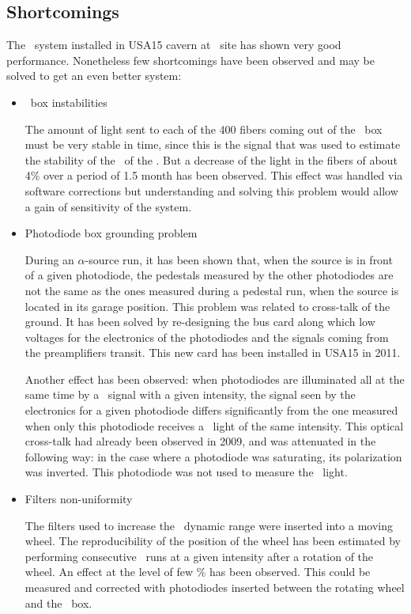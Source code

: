 \subsection{Shortcomings}
The \las~system installed in USA15 cavern at \atlas~site has shown very good performance. Nonetheless few shortcomings have been observed and may be solved to get an even better system:
\begin{itemize}
\item{\coimbra~box instabilities} 
	
The amount of light sent to each of the 400 fibers coming out of the \coimbra~box must be very stable in time, since this is the signal that was used to estimate the stability of the \pmts~of the \tilecal. But a decrease of the light in the fibers of about 4\% over a period of 1.5 month has been observed. This effect was handled via software corrections but understanding and solving this problem would allow a gain of sensitivity of the system.
	
\item{Photodiode box grounding problem} 
	
During an $\alpha$-source run, it has been shown that, when the source is in front of a given photodiode, the pedestals measured by the other photodiodes are not the same as the ones measured during a pedestal run, when the source is located in its garage position. This problem was related to cross-talk of the ground. It has been solved by re-designing the bus card along which low voltages for the electronics of the photodiodes and the signals coming from the preamplifiers transit. This new card has been installed in USA15 in 2011. \par
Another effect has been observed: when photodiodes are illuminated all at the same time by a \las~signal with a given intensity, the signal seen by the electronics for a given photodiode differs significantly from the one measured when only this photodiode receives a \las~light of the same intensity. This optical cross-talk had already been observed in 2009, and was attenuated in the following way: in the case where a photodiode was saturating, its polarization was inverted. This photodiode was not used to measure the  \las~light. 
		
\item{Filters non-uniformity}
	
The filters used to increase the \las~dynamic range were inserted into a moving wheel. The reproducibility of the position of the wheel has been estimated by performing consecutive \las~runs at a given intensity after a rotation of the wheel. An effect at the level of few \% has been observed. This could be measured and corrected with photodiodes inserted between the rotating wheel and the \coimbra~box.
	

\end{itemize}
